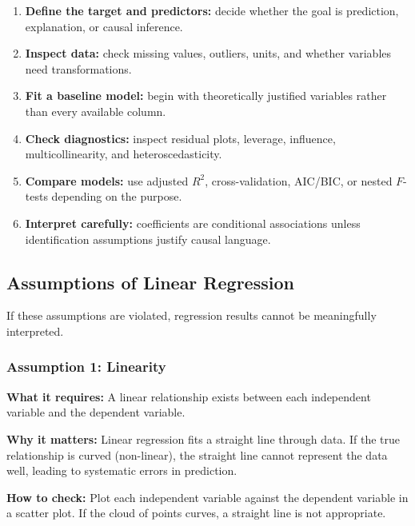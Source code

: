 \documentclass[12pt,openany]{book}
\begin{document}
\begin{enumerate}[leftmargin=*]
    \item \textbf{Define the target and predictors:} decide whether the goal is prediction, explanation, or causal inference.
    \item \textbf{Inspect data:} check missing values, outliers, units, and whether variables need transformations.
    \item \textbf{Fit a baseline model:} begin with theoretically justified variables rather than every available column.
    \item \textbf{Check diagnostics:} inspect residual plots, leverage, influence, multicollinearity, and heteroscedasticity.
    \item \textbf{Compare models:} use adjusted \(R^2\), cross-validation, AIC/BIC, or nested \(F\)-tests depending on the purpose.
    \item \textbf{Interpret carefully:} coefficients are conditional associations unless identification assumptions justify causal language.
\end{enumerate}

\subsection{Assumptions of Linear Regression}


If these assumptions are violated, regression results cannot be meaningfully interpreted.

\subsubsection{Assumption 1: Linearity}


\textbf{What it requires:} A linear relationship exists between each independent variable and the dependent variable.

\textbf{Why it matters:} Linear regression fits a straight line through data. If the true relationship is curved (non-linear), the straight line cannot represent the data well, leading to systematic errors in prediction.

\textbf{How to check:} Plot each independent variable against the dependent variable in a scatter plot. If the cloud of points curves, a straight line is not appropriate.
\end{document}
